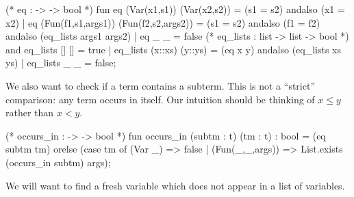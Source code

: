 \nwenddocs{}\endmoddef\nwstartdeflinemarkup{}\nwenddeflinemarkup
(* eq :  ->  -> bool *)
fun eq (Var(x1,s1)) (Var(x2,s2)) = (s1 = s2) andalso (x1 = x2)
  | eq (Fun(f1,s1,args1)) (Fun(f2,s2,args2)) =
      (s1 = s2) andalso (f1 = f2) andalso (eq_lists args1 args2)
  | eq _ _ = false
(* eq_lists :  list ->  list -> bool *)
and eq_lists [] [] = true
  | eq_lists (x::xs) (y::ys) = (eq x y) andalso (eq_lists xs ys)
  | eq_lists _ _ = false;
\eatline
{}\nwendcode{}\nwdocspar
\begin{node}
We also want to check if a term contains a subterm. This is not a
``strict'' comparison: any term occurs in itself.
Our intuition should be thinking of $x\leq y$ rather than $x<y$. 
\end{node}

\nwenddocs{}\endmoddef\nwstartdeflinemarkup{}\nwenddeflinemarkup
(* occurs_in :  ->  -> bool *)
fun occurs_in (subtm : t) (tm : t) : bool =
  (eq subtm tm) orelse
  (case tm of
    (Var _) => false
  | (Fun(_,_,args)) => List.exists (occurs_in subtm) args);
\eatline
{}\nwendcode{}\nwdocspar
\begin{node}
We will want to find a fresh variable which does not appear in a list
of variables.
\end{node}

